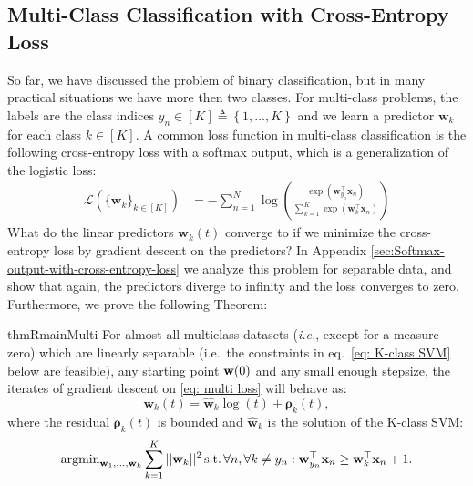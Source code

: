 \documentclass[twoside,11pt,english]{article}
\newcommand{\remove}[1]{}
\newcommand{\dnote}[1]{{[\color{blue}Daniel: #1]}}
\newcommand{\norm}[1]{\left\lVert{#1}\right\rVert}
\newcommand{\sumk}{\sum_{k=1}^{K}}
\newcommand{\vect}[1]{\mathbf{#1}}
\newcommand{\bm}[1]{\ensuremath{\boldsymbol{#1}}}
\begin{document}
\subsection{Multi-Class Classification with Cross-Entropy Loss}

So far, we have discussed the problem of binary classification, but in many practical situations we have more then two classes. For
multi-class problems, the labels are the
class indices $y_{n}\in[K]\triangleq\left\{ 1,\dots,K\right\}$ and we learn a predictor
$\mathbf{w}_{k}$ for each class $k\in[K]$. A common loss function in multi-class classification is  the following cross-entropy loss with
a softmax output, which is a generalization of the logistic loss:
\begin{align}\label{eq: multi loss}
\mathcal{L}\left(\{\mathbf{w}_{k}\}_{k\in[K]}\right) & =-\sum_{n=1}^{N}\log\left(\frac{\exp\left(\mathbf{w}_{y_{n}}^{\top}\mathbf{x}_{n}\right)}{\sum_{k=1}^{K}\exp\left(\mathbf{w}_{k}^{\top}\mathbf{x}_{n}\right)}\right)
\end{align}
What do the linear predictors $\mathbf{w}_{k}(t)$ converge to if
we minimize the cross-entropy loss by gradient descent on the predictors?
In Appendix \ref{sec:Softmax-output-with-cross-entropy-loss} we analyze
this problem for separable data, and show that again, the predictors
diverge to infinity and the loss converges to zero. Furthermore, we prove the following Theorem:
\remove{
Furthermore, we
show that, generically, the loss converges to a logistic loss for
transformed data, for which our theorems hold. This strongly suggests
that gradient descent converges to a scaling of the $K$-class SVM
solution: \dnote{Mor: upgrade this part to theorem, once you update the appendix}
\begin{equation}
\arg\min_{\w_{1},\ldots,\w_{K}}\sum_{k=1}^{K}\norm{\w_{k}}^{2}\,\textrm{s.t.}\,\forall n,\forall{k\neq y_{n}}:\w_{y_{n}}^{\top}\x_{n}\geq\w_{k}^{\top}\x_{n}+1\label{eq:multiSVM}
\end{equation}
We believe this can also be established rigorously and for generic
exponential tailed multi-class loss.}
\begin{restatable}{thmR}{mainMulti}
\label{thm:mainMulti}
	For almost all multiclass datasets ({\em{i.e.}},
	except for a measure zero) which are linearly separable (i.e.~the constraints in eq.~\ref{eq: K-class SVM} below are feasible), any starting point $\mathbf{w}(0)$ and any small enough stepsize, the iterates of gradient descent on \ref{eq: multi loss} will behave as: 
	\begin{equation} \label{eq:5}
	\vect{w}_k(t) = \hat{\vect{w}}_k \log(t)+\bm{\rho}_k(t),
	\end{equation}
	where the residual $\bm{\rho}_k(t)$ is bounded and $\hat{\vect{w}}_k$ is the solution of the K-class SVM:
	\begin{equation} \label{eq: K-class SVM}
	\argmin_{\vect{w}_1,...,\vect{w}_k}\sumk ||\vect{w}_k||^2\,\textrm{s.t.}\,\forall n,\forall k \ne y_n : \vect{w}_{y_n}^\top\vect{x}_n \ge \vect{w}_k^\top\vect{x}_n+1.
	\end{equation}
\end{restatable}
\end{document}
